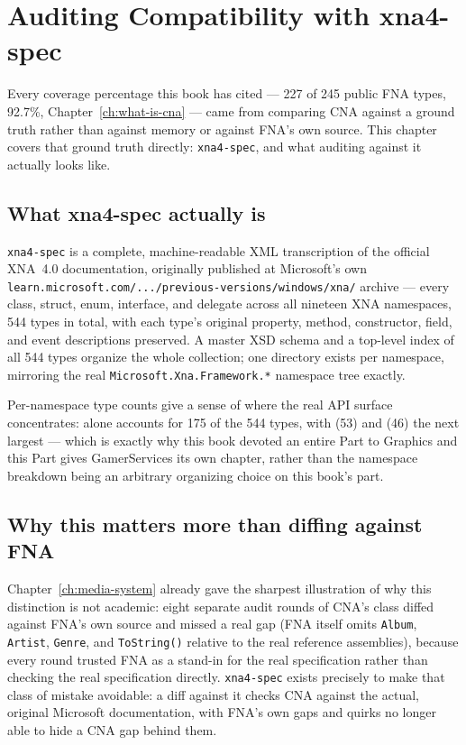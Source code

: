 \chapter{Auditing Compatibility with xna4-spec}
\label{ch:xna4-spec-auditing}

Every coverage percentage this book has cited --- 227 of 245 public FNA types, 92.7\%,
Chapter~\ref{ch:what-is-cna} --- came from comparing CNA against a ground truth rather than
against memory or against FNA's own source. This chapter covers that ground truth directly:
\texttt{xna4-spec}, and what auditing against it actually looks like.

\section{What xna4-spec actually is}

\texttt{xna4-spec} is a complete, machine-readable XML transcription of the official XNA~4.0
documentation, originally published at Microsoft's own
\texttt{learn.microsoft.com/\allowbreak{}.../\allowbreak{}previous-versions/\allowbreak{}windows/\allowbreak{}xna/}
archive --- every class,
struct, enum, interface, and delegate across all nineteen XNA namespaces, 544 types in total,
with each type's original property, method, constructor, field, and event descriptions
preserved. A master XSD schema and a top-level index of all 544 types organize the whole
collection; one directory exists per namespace, mirroring the real
\texttt{Microsoft.Xna.Framework.*} namespace tree exactly.

Per-namespace type counts give a sense of where the real API surface concentrates:
 alone accounts for 175 of the 544 types, with
 (53) and  (46) the next largest ---
which is exactly why this book devoted an entire Part to Graphics and this Part gives
GamerServices its own chapter, rather than the namespace breakdown being an arbitrary
organizing choice on this book's part.

\section{Why this matters more than diffing against FNA}

Chapter~\ref{ch:media-system} already gave the sharpest illustration of why this distinction
is not academic: eight separate audit rounds of CNA's  class diffed against
FNA's own source and missed a real gap (FNA itself omits \texttt{Album}, \texttt{Artist},
\texttt{Genre}, and \texttt{ToString()} relative to the real reference assemblies), because
every round trusted FNA as a stand-in for the real specification rather than checking the
real specification directly. \texttt{xna4-spec} exists precisely to make that class of
mistake avoidable: a diff against it checks CNA against the actual, original Microsoft
documentation, with FNA's own gaps and quirks no longer able to hide a CNA gap behind them.


